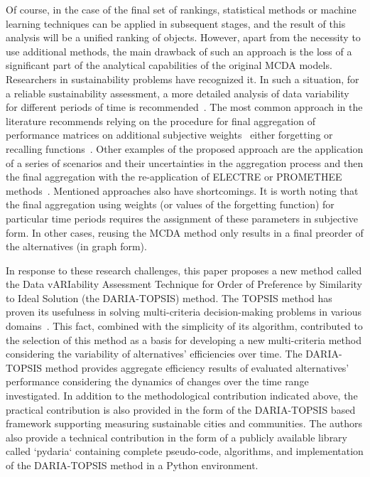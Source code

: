 \documentclass[5p,times]{elsarticle}
\newcounter{example}[section]
\begin{document}
Of course, in the case of the final set of rankings, statistical methods or machine learning techniques can be applied in subsequent stages, and the result of this analysis will be a unified ranking of objects. However, apart from the necessity to use additional methods, the main drawback of such an approach is the loss of a significant part of the analytical capabilities of the original MCDA models. Researchers in sustainability problems have recognized it. In such a situation, for a reliable sustainability assessment, a more detailed analysis of data variability for different periods of time is recommended~\cite{martins2021multidimensional}. The most common approach in the literature recommends relying on the procedure for final aggregation of performance matrices on additional subjective weights~\cite{banamar2018extension, urli2019promethee} either forgetting or recalling functions~\cite{watrobski2016multistage, karczmarczyk2018comparative}. Other examples of the proposed approach are the application of a series of scenarios and their uncertainties in the aggregation process and then the final aggregation with the re-application of ELECTRE or PROMETHEE methods~\cite{frini2018making, frini2020temporal, martins2021multidimensional}. Mentioned approaches also have shortcomings. It is worth noting that the final aggregation using weights (or values of the forgetting function) for particular time periods requires the assignment of these parameters in subjective form. In other cases, reusing the MCDA method only results in a final preorder of the alternatives (in graph form).

In response to these research challenges, this paper proposes a new method called the Data vARIability Assessment Technique for Order of Preference by Similarity to Ideal Solution (the DARIA-TOPSIS) method. The TOPSIS method has proven its usefulness in solving multi-criteria decision-making problems in various domains~\cite{behzadian2012state}. This fact, combined with the simplicity of its algorithm, contributed to the selection of this method as a basis for developing a new multi-criteria method considering the variability of alternatives’ efficiencies over time. The DARIA-TOPSIS method provides aggregate efficiency results of evaluated alternatives’ performance considering the dynamics of changes over the time range investigated. In addition to the methodological contribution indicated above, the practical contribution is also provided in the form of the DARIA-TOPSIS based framework supporting measuring sustainable cities and communities. The authors also provide a technical contribution in the form of a publicly available library called `pydaria` containing complete pseudo-code, algorithms, and implementation of the DARIA-TOPSIS method in a Python environment.
\end{document}
